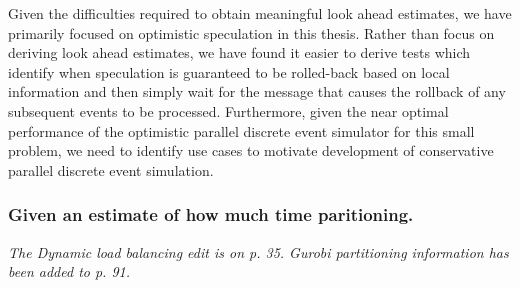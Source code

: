 \documentclass[10pt,letterpaper]{article}
\begin{document}
Given the difficulties required to obtain meaningful look ahead estimates, we have primarily focused on optimistic speculation in this thesis. Rather than focus on deriving look ahead estimates, we have found it easier to derive tests which identify when speculation is guaranteed to be rolled-back based on local information and then simply wait for the message that causes the rollback of any subsequent events to be processed. Furthermore, given the near optimal performance of the optimistic parallel discrete event simulator for this small problem, we need to identify use cases to motivate development of conservative parallel discrete event simulation.


\subsubsection*{Given an estimate of how much time paritioning.}
{\it The Dynamic load balancing edit is on p. 35. Gurobi partitioning information has been added to p. 91.}
\end{document}
